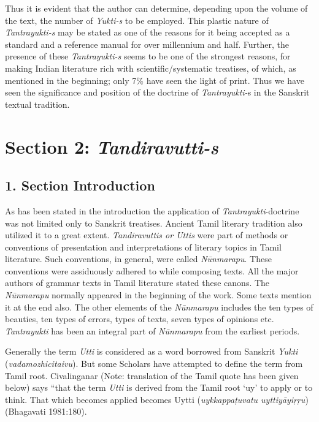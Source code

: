 Thus it is evident that the author can determine, depending upon the volume of the text, the number of \textit{Yukti-s} to be employed. This plastic nature of \textit{Tantrayukti-s} may be stated as one of the reasons for it being accepted as a standard and a reference manual for over millennium and half. Further, the presence of these \textit{Tantrayukti-s} seems to be one of the strongest reasons, for making Indian literature rich with scientific/systematic treatises, of which, as mentioned in the beginning; only 7\% have seen the light of print. Thus we have seen the significance and position of the doctrine of \textit{Tantrayukti-}s in the Sanskrit textual tradition.



\section*{Section 2: \textit{Tandiravutti-s}}

\subsection*{1. Section Introduction}

As has been stated in the introduction the application of \textit{Tantrayukti}-doctrine was not limited only to Sanskrit treatises. Ancient Tamil literary tradition also utilized it to a great extent. \textit{Tandiravuttis or Uttis} were part of methods or conventions of presentation and interpretations of literary topics in Tamil literature. Such conventions, in general, were called \textit{Nūnmarapu}. These conventions were assiduously adhered to while composing texts. All the major authors of grammar texts in Tamil literature stated these canons. The \textit{Nūnmarapu} normally appeared in the beginning of the work. Some texts mention it at the end also. The other elements of the \textit{Nūnmarapu} includes the ten types of beauties, ten types of errors, types of texts, seven types of opinions etc. \textit{Tantrayukti} has been an integral part of \textit{Nūnmarapu} from the earliest periods.

Generally the term \textit{Utti} is considered as a word borrowed from Sanskrit \textit{Yukti} (\textit{vadamozhicitaivu}). But some Scholars have attempted to define the term from Tamil root. Civalinganar (Note: translation of the Tamil quote has been given below) says “that the term \textit{Utti} is derived from the Tamil root ‘uy’ to apply or to think. That which becomes applied becomes Uytti (\textit{uykkappaṭuvatu uyttiyāyiṛṛu})\hfill (Bhagavati 1981:180).


